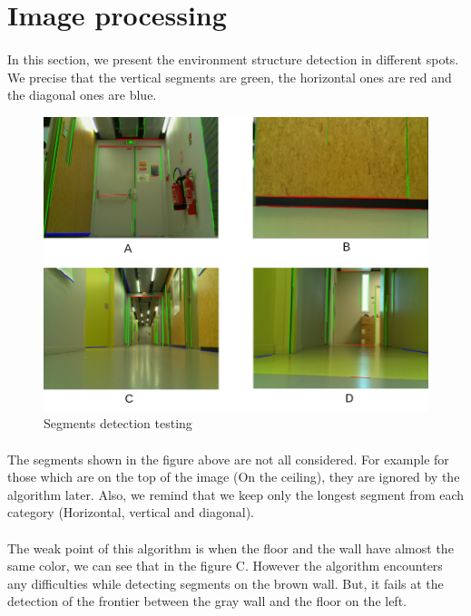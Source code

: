 \documentclass[12pt]{report}
\begin{document}
	\section{Image processing}
	\paragraph{}
	In this section, we present the environment structure detection in different spots. We precise that the vertical segments are green, the horizontal ones are red and the diagonal ones are blue.
		\begin{figure}[H]
		\begin{center}
			\includegraphics[scale=0.70]{res/img_proc.png}
			\caption{Segments detection testing}
		\end{center}
	\end{figure}
	\paragraph{}
	The segments shown in the figure above are not all considered. For example for those which are on the top of the image (On the ceiling), they are ignored by the algorithm later. Also, we remind that we keep only the longest segment from each category (Horizontal, vertical and diagonal).
	\paragraph{}
	The weak point of this algorithm is when the floor and the wall have almost the same color, we can see that in the figure C. However the algorithm encounters any difficulties while detecting segments on the brown wall. But, it fails at the detection of the frontier between the gray wall and the floor on the left.
	
\end{document}
